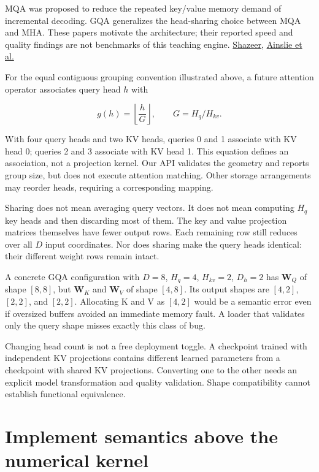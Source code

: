 MQA was proposed to reduce the repeated key/value memory demand of
incremental decoding. GQA generalizes the head-sharing choice between
MQA and MHA. These papers motivate the architecture; their reported
speed and quality findings are not benchmarks of this teaching engine.
\href{https://arxiv.org/abs/1911.02150}{Shazeer},
\href{https://arxiv.org/abs/2305.13245}{Ainslie et al.}

For the equal contiguous grouping convention illustrated above, a future
attention operator associates query head \(h\) with

\begin{equation}
g(h)=\left\lfloor\frac{h}{G}\right\rfloor,
\qquad G=H_q/H_{kv}.
\end{equation}

With four query heads and two KV heads, queries 0 and 1 associate with
KV head 0; queries 2 and 3 associate with KV head 1. This equation
defines an association, not a projection kernel. Our API validates the
geometry and reports group size, but does not execute attention
matching. Other storage arrangements may reorder heads, requiring a
corresponding mapping.

Sharing does not mean averaging query vectors. It does not mean
computing \(H_q\) key heads and then discarding most of them. The key
and value projection matrices themselves have fewer output rows. Each
remaining row still reduces over all \(D\) input coordinates. Nor does
sharing make the query heads identical: their different weight rows
remain intact.

A concrete GQA configuration with \(D=8\), \(H_q=4\), \(H_{kv}=2\),
\(D_h=2\) has \(\mathbf{W}_Q\) of shape \([8,8]\), but \(\mathbf{W}_K\)
and \(\mathbf{W}_V\) of shape \([4,8]\). Its output shapes are
\([4,2]\), \([2,2]\), and \([2,2]\). Allocating K and V as \([4,2]\)
would be a semantic error even if oversized buffers avoided an immediate
memory fault. A loader that validates only the query shape misses
exactly this class of bug.

Changing head count is not a free deployment toggle. A checkpoint
trained with independent KV projections contains different learned
parameters from a checkpoint with shared KV projections. Converting one
to the other needs an explicit model transformation and quality
validation. Shape compatibility cannot establish functional equivalence.

\section{Implement semantics above the numerical
kernel}\label{implement-semantics-above-the-numerical-kernel}


